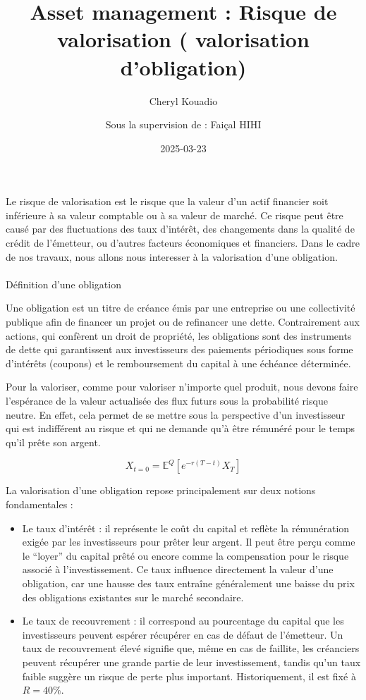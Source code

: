 \documentclass[
  letterpaper,
  DIV=11,
  numbers=noendperiod]{scrartcl}
\title{Asset management : Risque de valorisation ( valorisation
d'obligation)}
\author{Cheryl Kouadio \and Sous la supervision de : Faiçal HIHI}
\date{2025-03-23}
\makeatletter
\let\oldparagraph\paragraph
\renewcommand{\paragraph}{
    \@ifstar
      \xxxParagraphStar
      \xxxParagraphNoStar
  }
\newcommand{\xxxParagraphStar}[1]{\oldparagraph*{#1}\mbox{}}
\newcommand{\xxxParagraphNoStar}[1]{\oldparagraph{#1}\mbox{}}
\providecommand{\tightlist}{%
  \setlength{\itemsep}{0pt}\setlength{\parskip}{0pt}}\usepackage{longtable,booktabs,array}
\makeatother
\begin{document}
\maketitle


Le risque de valorisation est le risque que la valeur d'un actif
financier soit inférieure à sa valeur comptable ou à sa valeur de
marché. Ce risque peut être causé par des fluctuations des taux
d'intérêt, des changements dans la qualité de crédit de l'émetteur, ou
d'autres facteurs économiques et financiers. Dans le cadre de nos
travaux, nous allons nous interesser à la valorisation d'une obligation.

\paragraph{Définition d'une
obligation}\label{duxe9finition-dune-obligation}

Une obligation est un titre de créance émis par une entreprise ou une
collectivité publique afin de financer un projet ou de refinancer une
dette. Contrairement aux actions, qui confèrent un droit de propriété,
les obligations sont des instruments de dette qui garantissent aux
investisseurs des paiements périodiques sous forme d'intérêts (coupons)
et le remboursement du capital à une échéance déterminée.

Pour la valoriser, comme pour valoriser n'importe quel produit, nous
devons faire l'espérance de la valeur actualisée des flux futurs sous la
probabilité risque neutre. En effet, cela permet de se mettre sous la
perspective d'un investisseur qui est indifférent au risque et qui ne
demande qu'à être rémunéré pour le temps qu'il prête son argent.

\[
X_{t=0} = \mathbb{E}^Q \left[ e^{-r(T-t)} X_T \right]
\]

La valorisation d'une obligation repose principalement sur deux notions
fondamentales :

\begin{itemize}
\tightlist
\item
  Le taux d'intérêt : il représente le coût du capital et reflète la
  rémunération exigée par les investisseurs pour prêter leur argent. Il
  peut être perçu comme le ``loyer'' du capital prêté ou encore comme la
  compensation pour le risque associé à l'investissement. Ce taux
  influence directement la valeur d'une obligation, car une hausse des
  taux entraîne généralement une baisse du prix des obligations
  existantes sur le marché secondaire.
\item
  Le taux de recouvrement : il correspond au pourcentage du capital que
  les investisseurs peuvent espérer récupérer en cas de défaut de
  l'émetteur. Un taux de recouvrement élevé signifie que, même en cas de
  faillite, les créanciers peuvent récupérer une grande partie de leur
  investissement, tandis qu'un taux faible suggère un risque de perte
  plus important. Historiquement, il est fixé à \(R = 40\%\).
\end{itemize}
\end{document}
